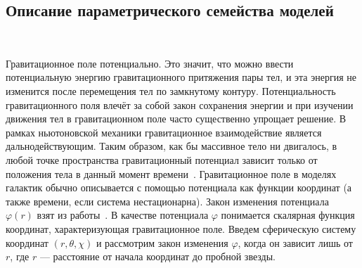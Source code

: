
\subsection{Описание параметрического семейства моделей}

~\par
Гравитационное поле потенциально. Это значит, что можно ввести потенциальную энергию гравитационного притяжения пары тел, и эта энергия не изменится после перемещения тел по замкнутому контуру. Потенциальность гравитационного поля влечёт за собой закон сохранения энергии и при изучении движения тел в гравитационном поле часто существенно упрощает решение. В рамках ньютоновской механики гравитационное взаимодействие является дальнодействующим. Таким образом, как бы массивное тело ни двигалось, в любой точке пространства гравитационный потенциал зависит только от положения тела в данный момент времени~\cite{LandauLifshitz}. Гравитационное поле в моделях галактик обычно описывается с помощью потенциала как функции координат (а также времени, если система нестационарна). Закон изменения потенциала $\varphi (r)$ взят из работы~\cite{RaspopvaOssipkovJiang}. В качестве потенциала $\varphi$ понимается скалярная функция координат, характеризующая гравитационное поле.  Введем сферическую систему координат $(r, \theta, \chi)$ и рассмотрим закон изменения $\varphi$, когда он зависит лишь от $r$, где $r$ --- расстояние от начала координат до пробной звезды.\\

